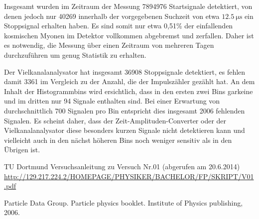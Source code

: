 Insgesamt wurden im Zeitraum der Messung 7894976 Startsignale detektiert, von denen jedoch nur 40269 innerhalb der vorgegebenen Suchzeit von etwa $\SI{12,5}{\micro\second}$ ein Stoppsignal erhalten haben. Es sind somit nur etwa 0,51\% der einfallenden kosmischen Myonen im Detektor vollkommen abgebremst und zerfallen. Daher ist es notwendig, die Messung über einen Zeitraum von mehreren Tagen durchzuführen um genug Statistik zu erhalten.

Der Vielkanalanalysator hat insgesamt 36908 Stoppsignale detektiert, es fehlen damit 3361 im Vergleich zu der Anzahl, die der Impulszähler gezählt hat. An dem Inhalt der Histogrammbins wird ersichtlich, dass in den ersten zwei Bins garkeine und im dritten nur 94 Signale enthalten sind. Bei einer Erwartung von durchschnittlich 700 Signalen pro Bin entspricht dies insgesamt 2006 fehlenden Signalen. Es scheint daher, dass der Zeit-Amplituden-Converter oder der Vielkanalanalysator diese besonders kurzen Signale nicht detektieren kann und vielleicht auch in den nächst höheren Bins noch weniger sensitiv als in den Übrigen ist.
\vfill
\begin{thebibliography}{WissOnl}
 TU Dortmund Versuchsanleitung zu Versuch Nr.01 (abgerufen am 20.6.2014) \url{http://129.217.224.2/HOMEPAGE/PHYSIKER/BACHELOR/FP/SKRIPT/V01.pdf}

 Particle Data Group. Particle physics booklet. Institute of Physics publishing, 2006.

\end{thebibliography}

